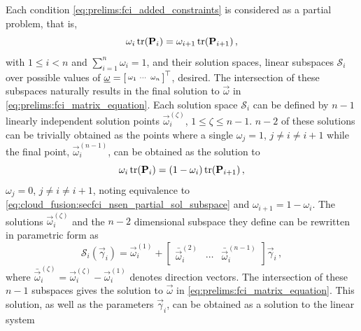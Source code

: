 Each condition \eqref{eq:prelims:fci_added_constraints} is considered as a partial problem, that is,
\begin{equation}\label{eq:cloud_fusion:secfci_nsen_partial_sol_subspace}
    \omega_i\tr(\mat{P}_i) = \omega_{i+1}\tr(\mat{P}_{i+1})\,,
\end{equation}
with $1\leq i< n$ and $\sum_{i=1}^n\omega_i=1$, and their solution spaces, linear subspaces $\mathcal{S}_i$ over possible values of $\vec{\omega}=\begin{bsmallmatrix}\omega_1 & \cdots & \omega_n\end{bsmallmatrix}^\top$, desired. The intersection of these subspaces naturally results in the final solution to $\vec{\omega}$ in \eqref{eq:prelims:fci_matrix_equation}. Each solution space $\mathcal{S}_i$ can be defined by $n-1$ linearly independent solution points $\vec{\omega}_i^{(\zeta)}$, $1\leq \zeta\leq n-1$. $n-2$ of these solutions can be trivially obtained as the points where a single $\omega_j=1$, $j\neq i\neq i+1$ while the final point, $\vec{\omega}_i^{(n-1)}$, can be obtained as the solution to
\begin{equation}\label{eq:cloud_fusion:secfci_nsen_partial_sol_point}
    \omega_i\tr(\mat{P}_i) = (1-\omega_i)\tr(\mat{P}_{i+1})\,,
\end{equation}
$\omega_j=0$, $j\neq i\neq i+1$, noting equivalence to \eqref{eq:cloud_fusion:secfci_nsen_partial_sol_subspace} and $\omega_{i+1}=1-\omega_i$. The solutions $\vec{\omega}_i^{(\zeta)}$ and the $n-2$ dimensional subspace they define can be rewritten in parametric form as
\begin{equation}\label{eq:cloud_fusion:secfci_nsen_partial_subspace}
    \mathcal{S}_i(\vec{\gamma}_i)=\vec{\omega}_i^{(1)} + 
    \begin{bmatrix}
        \bar{\vec{\omega}}_i^{(2)} & \cdots & \bar{\vec{\omega}}_i^{(n-1)}
    \end{bmatrix}
    \vec{\gamma}_i\,,
\end{equation}
where $\bar{\vec{\omega}}_i^{(\zeta)}=\vec{\omega}_i^{(\zeta)}-\vec{\omega}_i^{(1)}$ denotes direction vectors. The intersection of these $n-1$ subspaces gives the solution to $\vec{\omega}$ in \eqref{eq:prelims:fci_matrix_equation}. This solution, as well as the parameters $\vec{\gamma}_i$, can be obtained as a solution to the linear system
